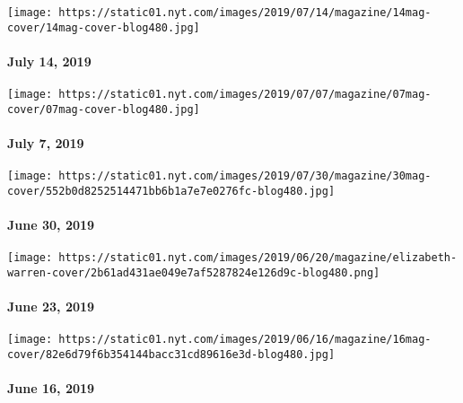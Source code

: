 \href{https://www.nytimes.com/issue/magazine/2019/07/11/the-71419-issue}{}

\texttt{[image: https://static01.nyt.com/images/2019/07/14/magazine/14mag-cover/14mag-cover-blog480.jpg]}

\hypertarget{july-14-2019}{%
\paragraph{July 14, 2019}\label{july-14-2019}}

\href{https://www.nytimes.com/issue/magazine/2019/07/09/the-7719-issue}{}

\texttt{[image: https://static01.nyt.com/images/2019/07/07/magazine/07mag-cover/07mag-cover-blog480.jpg]}

\hypertarget{july-7-2019}{%
\paragraph{July 7, 2019}\label{july-7-2019}}

\href{https://www.nytimes.com/issue/magazine/2019/07/01/the-63019-issue}{}

\texttt{[image: https://static01.nyt.com/images/2019/07/30/magazine/30mag-cover/552b0d8252514471bb6b1a7e7e0276fc-blog480.jpg]}

\hypertarget{june-30-2019}{%
\paragraph{June 30, 2019}\label{june-30-2019}}

\href{https://www.nytimes.com/issue/magazine/2019/06/25/the-62319-issue}{}

\texttt{[image: https://static01.nyt.com/images/2019/06/20/magazine/elizabeth-warren-cover/2b61ad431ae049e7af5287824e126d9c-blog480.png]}

\hypertarget{june-23-2019}{%
\paragraph{June 23, 2019}\label{june-23-2019}}

\href{https://www.nytimes.com/issue/magazine/2019/06/25/the-61619-issue}{}

\texttt{[image: https://static01.nyt.com/images/2019/06/16/magazine/16mag-cover/82e6d79f6b354144bacc31cd89616e3d-blog480.jpg]}

\hypertarget{june-16-2019}{%
\paragraph{June 16, 2019}\label{june-16-2019}}

